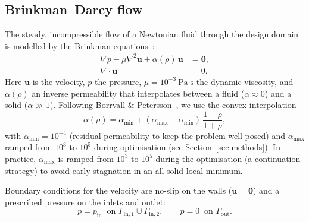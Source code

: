 \subsection{Brinkman--Darcy flow}
\label{sec:brinkman}
The steady, incompressible flow of a Newtonian fluid through the design domain is modelled by the Brinkman equations~\cite{borrvall2003}:
\begin{subequations}
\label{eq:brinkman}
\begin{align}
    \nabla p - \mu \nabla^2 \mathbf{u} + \alpha(\rho)\,\mathbf{u} &= \mathbf{0}, \label{eq:brinkman_momentum}\\
    \nabla\cdot\mathbf{u} &= 0. \label{eq:brinkman_continuity}
\end{align}
\end{subequations}
Here \(\mathbf{u}\) is the velocity, \(p\) the pressure, \(\mu = 10^{-3}\ \text{Pa·s}\) the dynamic viscosity, and \(\alpha(\rho)\) an inverse permeability that interpolates between a fluid (\(\alpha\approx 0\)) and a solid (\(\alpha\gg 1\)).
Following Borrvall \& Petersson~\cite{borrvall2003}, we use the convex interpolation
\begin{equation}
    \alpha(\rho) = \alpha_{\min} + (\alpha_{\max} - \alpha_{\min})\,\frac{1-\rho}{1+\rho},
    \label{eq:alpha}
\end{equation}
with \(\alpha_{\min}=10^{-4}\) (residual permeability to keep the problem well-posed) and \(\alpha_{\max}\) ramped from \(10^{3}\) to \(10^{5}\) during optimisation (see Section~\ref{sec:methods}).
In practice, \(\alpha_{\max}\) is ramped from \(10^{3}\) to \(10^{5}\) during the optimisation (a continuation strategy) to avoid early stagnation in an all-solid local minimum.

Boundary conditions for the velocity are no-slip on the walls (\(\mathbf{u}=\mathbf{0}\)) and a prescribed pressure on the inlets and outlet:
\begin{equation}
    p = p_{\text{in}} \;\; \text{on } \Gamma_{\text{in},1}\cup\Gamma_{\text{in},2}, \qquad p = 0 \;\; \text{on } \Gamma_{\text{out}}.
\end{equation}

